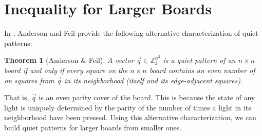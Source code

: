 \documentclass[a4paper]{article}
\newtheorem{theorem}{Theorem}
\newcommand{\Z}{\mathbb{Z}}
\begin{document}
	\section{Inequality for Larger Boards}
	In \cite{anderson_feil}, Anderson and Feil provide the following alternative characterization of quiet patterns:
	
	\begin{theorem}[Anderson \& Feil]\label{alt-characterization-quiet-patterns}
		A vector $\vec{q} \in \Z^{n^2}_2$ is a quiet pattern of an $n \times n$ board if and only if every square on the $n \times n$ board contains an even number of on squares from $\vec{q}$ in its neighborhood (itself and its edge-adjacent squares).
	\end{theorem}
	That is, $\vec{q}$ is an even parity cover of the board.
	This is because the state of any light is uniquely determined by the parity of the number of times a light in its neighborhood have been pressed. Using this alternative characterization, we can build quiet patterns for larger boards from smaller ones.
	
\end{document}
